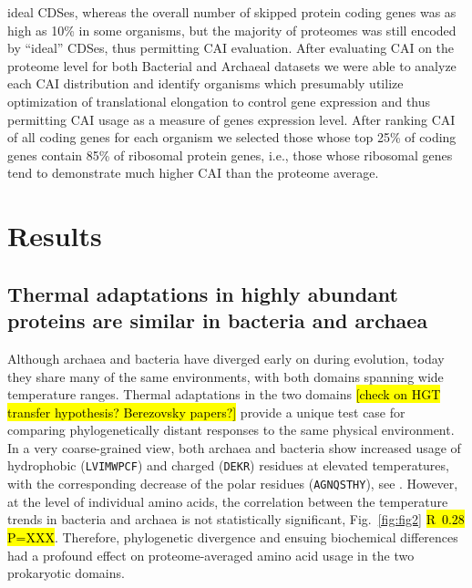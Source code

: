\documentclass[10pt,letterpaper]{article}
\begin{document}
ideal CDSes, whereas the overall number of skipped protein coding genes was as high as 10\% in some organisms, but the majority of proteomes was still encoded by ``ideal'' CDSes, thus permitting CAI evaluation. After evaluating CAI on the proteome level for both Bacterial and Archaeal datasets we were able to analyze each CAI distribution and identify organisms which presumably utilize optimization of translational elongation to control gene expression and thus permitting CAI usage as a measure of genes expression level. After ranking CAI of all coding genes for each organism we selected those whose top 25\% of coding genes contain 85\% of ribosomal protein genes, i.e., those whose ribosomal genes tend to demonstrate much higher CAI than the proteome average. 

\section*{Results}

\subsection{Thermal adaptations in highly abundant proteins are similar in bacteria and archaea}

Although archaea and bacteria have diverged early on during evolution, today they share many of the same environments, with both domains spanning wide temperature ranges. Thermal adaptations in the two domains \hl{[check on HGT transfer hypothesis? Berezovsky papers?]} provide a unique test case for comparing phylogenetically distant responses to the same physical environment. In a very coarse-grained view, both archaea and bacteria show increased usage of hydrophobic (\texttt{LVIMWPCF}) and charged (\texttt{DEKR}) residues at elevated temperatures, with the corresponding decrease of the polar residues (\texttt{AGNQSTHY}), see . However, at the level of individual amino acids, the correlation between the temperature trends in bacteria and archaea is not statistically significant, Fig.~\ref{fig:fig2} \hl{R~0.28 P=XXX}.  Therefore, phylogenetic divergence and ensuing biochemical differences had a profound effect on proteome-averaged amino acid usage in the two prokaryotic domains. 
\end{document}

